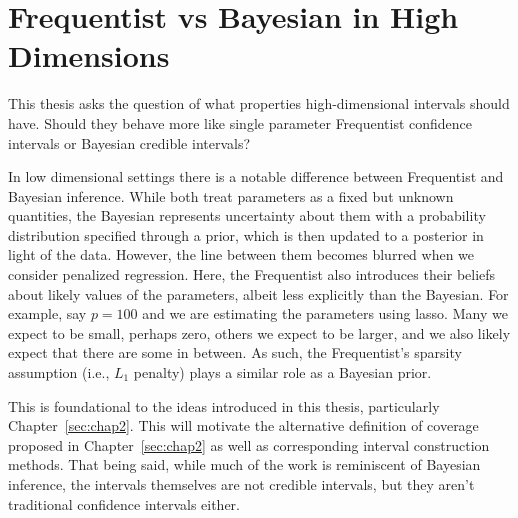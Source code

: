 \section{Frequentist vs Bayesian in High Dimensions}

This thesis asks the question of what properties high-dimensional intervals should have. Should they behave more like single parameter Frequentist confidence intervals or Bayesian credible intervals?

In low dimensional settings there is a notable difference between Frequentist and Bayesian inference. While both treat parameters as a fixed but unknown quantities, the Bayesian represents uncertainty about them with a probability distribution specified through a prior, which is then updated to a posterior in light of the data. However, the line between them becomes blurred when we consider penalized regression. Here, the Frequentist also introduces their beliefs about likely values of the parameters, albeit less explicitly than the Bayesian. For example, say $p = 100$ and we are estimating the parameters using lasso. Many we expect to be small, perhaps zero, others we expect to be larger, and we also likely expect that there are some in between. As such, the Frequentist's sparsity assumption (i.e., $L_1$ penalty) plays a similar role as a Bayesian prior.

This is foundational to the ideas introduced in this thesis, particularly Chapter~\ref{sec:chap2}. This will motivate the alternative definition of coverage proposed in Chapter~\ref{sec:chap2} as well as corresponding interval construction methods. That being said, while much of the work is reminiscent of Bayesian inference, the intervals themselves are not credible intervals, but they aren't traditional confidence intervals either. 